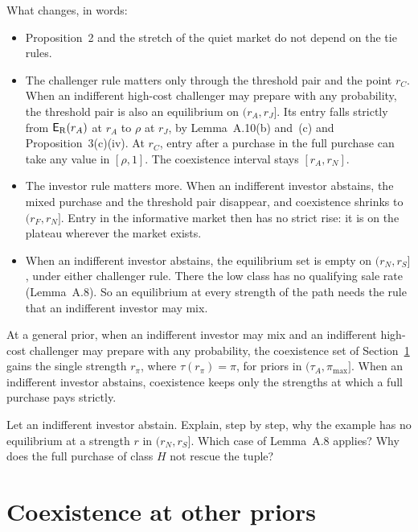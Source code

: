 What changes, in words:
\begin{itemize}
\item Proposition~2 and the stretch of the quiet market do not depend on the tie rules.
\item The challenger rule matters only through the threshold pair and the point \(r_C\). When an indifferent
high-cost challenger may prepare with any probability, the threshold pair is also an equilibrium on \((r_A,r_J]\). Its
entry falls strictly from \(\mathsf{E}_{\rm R}(r_A)\) at \(r_A\) to \(\rho\) at \(r_J\), by Lemma~A.10(b) and~(c) and
Proposition~3(c)(iv). At \(r_C\), entry after a purchase in the full purchase can take any value in \([\rho,1]\). The
coexistence interval stays \([r_A,r_N]\).
\item The investor rule matters more. When an indifferent investor abstains, the mixed purchase and the threshold pair
disappear, and coexistence shrinks to \((r_F,r_N]\). Entry in the informative market then has no strict rise: it is
on the plateau wherever the market exists.
\item When an indifferent investor abstains, the equilibrium set is empty on \((r_N,r_S]\), under either challenger
rule. There the low class has no qualifying sale rate (Lemma~A.8). So an equilibrium at every strength of the path
needs the rule that an indifferent investor may mix.
\end{itemize}

At a general prior, when an indifferent investor may mix and an indifferent high-cost challenger may prepare with
any probability, the coexistence set of Section~\ref{sec:coexistence-priors} gains the single strength \(r_\pi\), where
\(\tau(r_\pi)=\pi\), for priors in \((\tau_A,\pi_{\max}]\). When an indifferent investor abstains, coexistence keeps only
the strengths at which a full purchase pays strictly.

\begin{checkyourself}\label{q:coexistence-abstain}
Let an indifferent investor abstain. Explain, step by step, why the example has no equilibrium at a strength \(r\) in
\((r_N,r_S]\). Which case of Lemma~A.8 applies? Why does the full purchase of class \(H\) not rescue the tuple?
\end{checkyourself}

\section{Coexistence at other priors}\label{sec:coexistence-priors}

